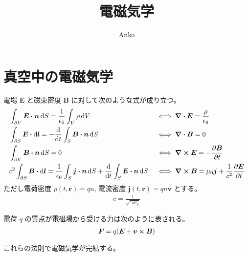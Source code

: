 \documentclass[uplatex,dvipdfmx,a4paper,11pt]{jlreq}
\title{電磁気学}
\author{Anko}
\newcommand{\EE}{\bm{E}}
\newcommand{\BB}{\bm{B}}
\newcommand{\rr}{\bm{r}}
\theoremstyle{definition}
\begin{document}
\maketitle
\tableofcontents
\clearpage

\section{真空中の電磁気学}
\begin{definition}
  電場 $\EE$ と磁束密度 $\BB$ に対して次のような式が成り立つ。
  \begin{align}
     & \int_{\partial V}\EE\vdot\bm{n}\dd{S} = \frac{1}{\epsilon_0}\int_V\rho\dd{V}                                                   &  & \iff \vnabla\vdot\EE  = \frac{\rho}{\epsilon_0}                                \\
     & \int_{\partial S}\EE\vdot\dd{\bm{l}} = -\dv{t}\int_S\BB\vdot\bm{n}\dd{S}                                                       &  & \iff \vnabla\vdot\BB  = 0                                                      \\
     & \int_{\partial V}\BB\vdot\bm{n}\dd{S} = 0                                                                                      &  & \iff \vnabla\cross\EE = -\pdv{\BB}{t}                                          \\
     & c^2\int_{\partial S}\BB\vdot\dd{\bm{l}} = \frac{1}{\epsilon_0}\int_S\bm{j}\vdot\bm{n}\dd{S} + \dv{t}\int_S\EE\vdot\bm{n}\dd{S} &  & \iff \vnabla\cross\BB = \mu_0\bm{j} + \frac{1}{c^2}\pdv{\EE}{t} \label{Ampere}
  \end{align}
  ただし電荷密度 $\rho(t, \rr) = qn$, 電流密度 $\bm{j}(t, \rr) = qn\bm{v}$ とする。
  \begin{align}
    c = \frac{1}{\sqrt{\varepsilon_0\mu_0}}
  \end{align}
\end{definition}
\begin{definition}[Lorentz 力]
  電荷 $q$ の質点が電磁場から受ける力は次のように表される。
  \begin{align}
    \bm{F} = q(\EE + \bm{v}\cross\BB)
  \end{align}
\end{definition}
これらの法則で電磁気学が完結する。
\end{document}
